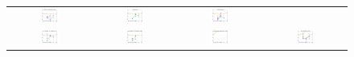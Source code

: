 \documentclass{article}
\begin{document}
\begin{figure}[htbp!]
\begin{tabular}{@{}c@{}c@{}c@{}c@{}}
\includegraphics[width=0.25\textwidth, trim=20mm 7mm 15mm 3mm, clip]{ppfigdim_f014}&
\includegraphics[width=0.25\textwidth, trim=20mm 7mm 15mm 3mm, clip]{ppfigdim_f015}&
\includegraphics[width=0.25\textwidth, trim=20mm 7mm 15mm 3mm, clip]{ppfigdim_f016}\\
\includegraphics[width=0.25\textwidth, trim=20mm 7mm 15mm 3mm, clip]{ppfigdim_f017}&
\includegraphics[width=0.25\textwidth, trim=20mm 7mm 15mm 3mm, clip]{ppfigdim_f018}&
\includegraphics[width=0.25\textwidth, trim=20mm 7mm 15mm 3mm, clip]{ppfigdim_f019}&
\includegraphics[width=0.25\textwidth, trim=20mm 7mm 15mm 3mm, clip]{ppfigdim_f020}\\

\end{tabular}
\end{figure}
\end{document}
